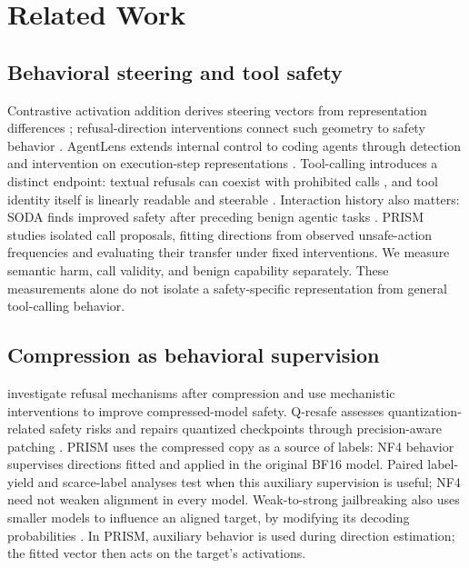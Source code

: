 \section{Related Work}
\label{sec:related}

\subsection{Behavioral steering and tool safety}
Contrastive activation addition derives steering vectors from representation differences \citep{panickssery2024steering}; refusal-direction interventions connect such geometry to safety behavior \citep{arditi2024refusal}. AgentLens extends internal control to coding agents through detection and intervention on execution-step representations \citep{luo2026agentlens}. Tool-calling introduces a distinct endpoint: textual refusals can coexist with prohibited calls \citep{cartagena2026gap}, and tool identity itself is linearly readable and steerable \citep{wu2026linear}. Interaction history also matters: SODA finds improved safety after preceding benign agentic tasks \citep{sun2026soda}. PRISM studies isolated call proposals, fitting directions from observed unsafe-action frequencies and evaluating their transfer under fixed interventions. We measure semantic harm, call validity, and benign capability separately. These measurements alone do not isolate a safety-specific representation from general tool-calling behavior.

\subsection{Compression as behavioral supervision}
\citet{chhabra2025compressed} investigate refusal mechanisms after
compression and use mechanistic interventions to improve compressed-model safety. Q-resafe assesses quantization-related safety risks and repairs quantized checkpoints through precision-aware patching \citep{chen2025qresafe}. PRISM uses the compressed copy as a source of labels: NF4 behavior supervises directions fitted and applied in the original BF16 model. Paired label-yield and scarce-label analyses test when this auxiliary supervision is useful; NF4 need not weaken alignment in every model. Weak-to-strong jailbreaking also uses smaller models to influence an aligned target, by modifying its decoding probabilities \citep{zhao2024weakstrong}. In PRISM, auxiliary behavior is used during direction estimation; the fitted vector then acts on the target's activations.

